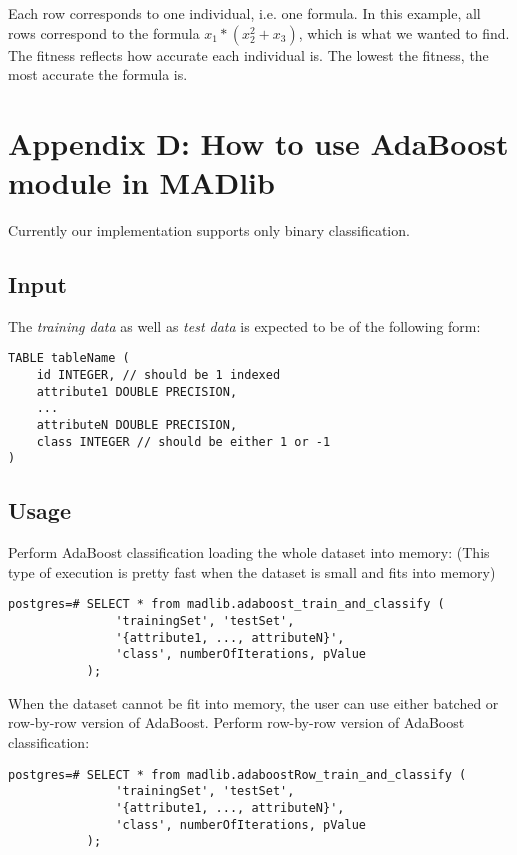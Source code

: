 {\raggedleft Each row corresponds to one individual, i.e. one formula. In this example, all rows correspond to the formula $x_1*(x_2^2+x_3)$, which is what we wanted to find. The fitness reflects how accurate each individual is. The lowest the fitness, the most accurate the formula is.}


\section*{Appendix D: How to use AdaBoost module in MADlib}
\label{sec:adaapp}
Currently our implementation supports only binary classification.

\subsection*{Input}
The {\itshape training data} as well as {\itshape test data} is expected to be of the following form:

\begin{verbatim}
TABLE tableName (
    id INTEGER, // should be 1 indexed
    attribute1 DOUBLE PRECISION,
    ...
    attributeN DOUBLE PRECISION,
    class INTEGER // should be either 1 or -1
)
\end{verbatim}

\subsection*{Usage}
Perform AdaBoost classification loading the whole dataset into memory: (This type of execution is pretty fast when the dataset is small and fits into memory)

\begin{verbatim}
postgres=# SELECT * from madlib.adaboost_train_and_classify (
               'trainingSet', 'testSet', 
               '{attribute1, ..., attributeN}', 
               'class', numberOfIterations, pValue
           );
\end{verbatim}

When the dataset cannot be fit into memory, the user can use either batched or row-by-row version of AdaBoost.
\vspace{\baselineskip}
{\raggedleft Perform row-by-row version of AdaBoost classification:}

\begin{verbatim}
postgres=# SELECT * from madlib.adaboostRow_train_and_classify (
               'trainingSet', 'testSet', 
               '{attribute1, ..., attributeN}', 
               'class', numberOfIterations, pValue
           );
\end{verbatim}


